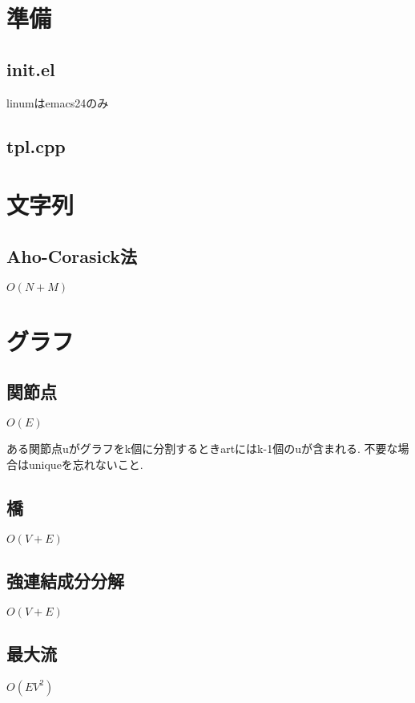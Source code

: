 \documentclass[10pt,twocolumn,a4j,landscape]{jsarticle}
\begin{document}
\tableofcontents
\newpage
%
%
\section{準備}
\subsection{init.el}
linumはemacs24のみ


\subsection{tpl.cpp}


\section{文字列}
\subsection{Aho-Corasick法}
$O(N+M)$\par


\section{グラフ}
\subsection{関節点}
$O(E)$\par
ある関節点uがグラフをk個に分割するときartにはk-1個のuが含まれる. 不要な場合はuniqueを忘れないこと.\par

\subsection{橋}
$O(V+E)$\par


\subsection{強連結成分分解}
$O(V+E)$\par


\subsection{最大流}
$O(EV^2)$\par

\end{document}
